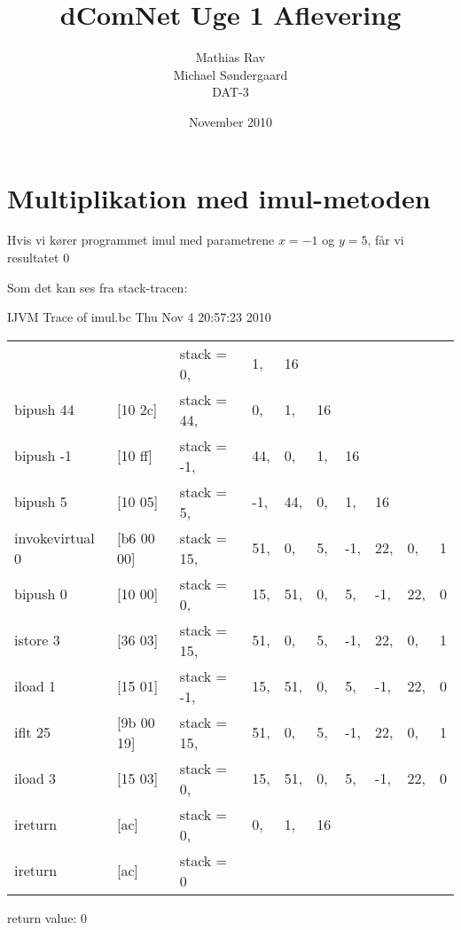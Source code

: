 \documentclass[12pt,a4paper]{article}
\begin{document}
\title{dComNet Uge 1 Aflevering}
\author{Mathias Rav \\
		Michael Søndergaard \\
		DAT-3}
\date{November 2010}
\maketitle

\section{Multiplikation med imul-metoden}
Hvis vi kører programmet imul med parametrene $x=-1$ og $y=5$, får vi resultatet $0$

Som det kan ses fra stack-tracen:

IJVM Trace of imul.bc Thu Nov  4 20:57:23 2010

\begin{tabular}{llllllllll}
                  &           & stack = 0,& 1,& 16 \\
bipush 44         & [10 2c]   & stack = 44,& 0,& 1,& 16 \\
bipush -1         & [10 ff]   & stack = -1,& 44,& 0,& 1,& 16 \\
bipush 5          & [10 05]   & stack = 5,& -1,& 44,& 0,& 1,& 16 \\
invokevirtual 0   & [b6 00 00]& stack = 15,& 51,& 0,& 5,& -1,& 22,& 0,& 1 \\
bipush 0          & [10 00]   & stack = 0,& 15,& 51,& 0,& 5,& -1,& 22,& 0 \\
istore 3          & [36 03]   & stack = 15,& 51,& 0,& 5,& -1,& 22,& 0,& 1 \\
iload 1           & [15 01]   & stack = -1,& 15,& 51,& 0,& 5,& -1,& 22,& 0 \\
iflt 25           & [9b 00 19]& stack = 15,& 51,& 0,& 5,& -1,& 22,& 0,& 1 \\
iload 3           & [15 03]   & stack = 0,& 15,& 51,& 0,& 5,& -1,& 22,& 0 \\
ireturn           & [ac]      & stack = 0,& 0,& 1,& 16 \\
ireturn           & [ac]      & stack = 0 \\
\end{tabular}

return value: 0
\end{document}
